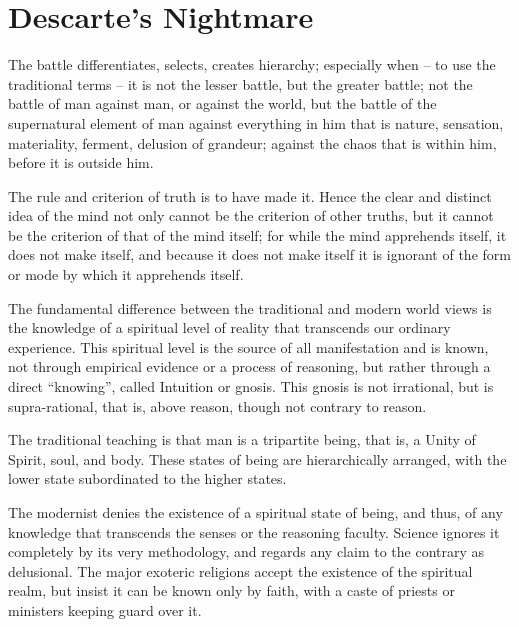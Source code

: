 \section{Descarte’s Nightmare}

\begin{quotex}
The battle differentiates, selects, creates hierarchy; especially when -- to use the traditional terms -- it is not the lesser battle, but the greater battle; not the battle of man against man, or against the world, but the battle of the supernatural element of man against everything in him that is nature, sensation, materiality, ferment, delusion of grandeur; against the chaos that is within him, before it is outside him.
\end{quotex}


\begin{quotex}
The rule and criterion of truth is to have made it. Hence the clear and distinct idea of the mind not only cannot be the criterion of other truths, but it cannot be the criterion of that of the mind itself; for while the mind apprehends itself, it does not make itself, and because it does not make itself it is ignorant of the form or mode by which it apprehends itself.
\end{quotex}


The fundamental difference between the traditional and modern world views is the knowledge of a spiritual level of reality that transcends our ordinary experience. This spiritual level is the source of all manifestation and is known, not through empirical evidence or a process of reasoning, but rather through a direct ``knowing'', called Intuition or gnosis. This gnosis is not irrational, but is supra-rational, that is, above reason, though not contrary to reason.

The traditional teaching is that man is a tripartite being, that is, a Unity of Spirit, soul, and body. These states of being are hierarchically arranged, with the lower state subordinated to the higher states.

The modernist denies the existence of a spiritual state of being, and thus, of any knowledge that transcends the senses or the reasoning faculty. Science ignores it completely by its very methodology, and regards any claim to the contrary as delusional. The major exoteric religions accept the existence of the spiritual realm, but insist it can be known only by faith, with a caste of priests or ministers keeping guard over it.

